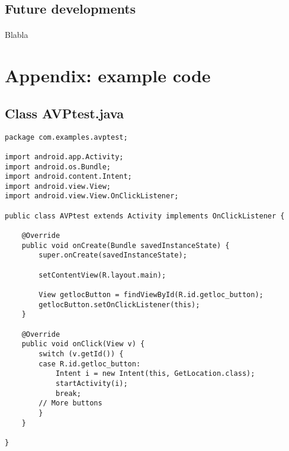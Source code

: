 \documentclass[letterpaper,twocolumn,10pt]{article}
\begin{document}
\subsection{Future developments}
\paragraph{}
Blabla


{\footnotesize 

}

\theendnotes

\vfill
\break

\onecolumn
\appendix
\label{app:appendixA}
\lstset{language=Java}  
\section{Appendix: example code}

\subsection{Class AVPtest.java}
\begin{lstlisting}
package com.examples.avptest;

import android.app.Activity;
import android.os.Bundle;
import android.content.Intent;
import android.view.View;
import android.view.View.OnClickListener;

public class AVPtest extends Activity implements OnClickListener {

	@Override
	public void onCreate(Bundle savedInstanceState) {
		super.onCreate(savedInstanceState);

		setContentView(R.layout.main);
		
		View getlocButton = findViewById(R.id.getloc_button);
		getlocButton.setOnClickListener(this);
	}

	@Override
	public void onClick(View v) {
		switch (v.getId()) {
		case R.id.getloc_button:
			Intent i = new Intent(this, GetLocation.class);
			startActivity(i);
			break;
		// More buttons
		}
	}

}
\end{lstlisting}
\end{document}
